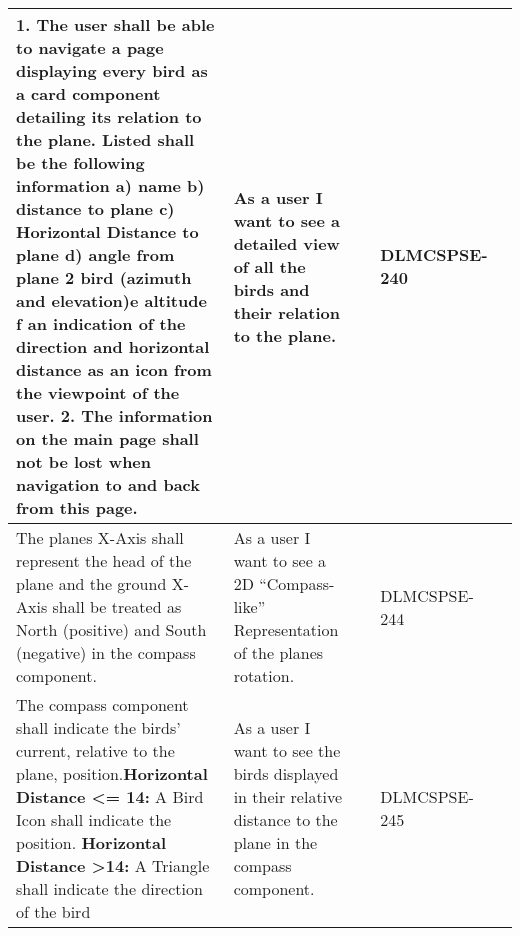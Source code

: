 \begin{xltabular}{\textwidth}{|X|X|M{1.8cm}|M{1.4cm}|M{1.3cm}|}
  \textbf{1.} The user shall be able to navigate a page displaying every bird as a card component detailing its relation to the plane. Listed shall be the following information \newline \textbf{a)} name \newline \textbf{b)} distance to plane \newline \textbf{c)} Horizontal Distance to plane \newline \textbf{d)} angle from plane 2 bird (azimuth and elevation)\newline \textbf{e} altitude \newline \textbf{f} an indication of the direction and horizontal distance as an icon from the viewpoint of the user. \newline \newline \textbf{2.} The information on the main page shall not be lost when navigation to and back from this page. & As a user I want to see a detailed view of all the birds and their relation to the plane. &  & {\color{purpleT}\ttfamily DLMCSPSE-240} &  \\ \hline 
  The planes X-Axis shall represent the head of the plane and the ground X-Axis shall be treated as North (positive) and South (negative) in the compass component. & As a user I want to see a 2D “Compass-like” Representation of the planes rotation. &  & {\color{purpleT}\ttfamily DLMCSPSE-244} &  \\ \hline 
  The compass component shall indicate the birds' current, relative to the plane, position.\newline \textbf{Horizontal Distance \textless = 14:} \newline A Bird Icon shall indicate the position. \newline \newline \textbf{Horizontal Distance \textgreater 14:} \newline A Triangle shall indicate the direction of the bird & As a user I want to see the birds displayed in their relative distance to the plane in the compass component. &  & {\color{purpleT}\ttfamily DLMCSPSE-245} &  \\ \hline 

\end{xltabular}
